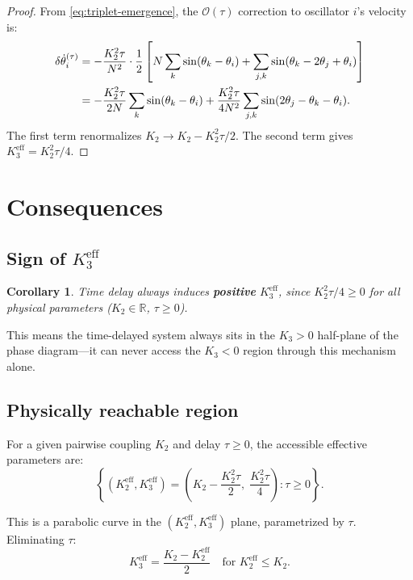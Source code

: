 \documentclass[11pt]{article}
\newcommand{\Order}{\mathcal{O}}
\newtheorem{corollary}{Corollary}
\begin{document}
\begin{proof}
  From \eqref{eq:triplet-emergence}, the $\Order(\tau)$ correction to
  oscillator $i$'s velocity is:
  \begin{align}
    \delta\dot{\theta}_i^{(\tau)}
    &= -\frac{K_2^2\tau}{N^2}\cdot\frac{1}{2}
      \left[N\sum_k\sin(\theta_k-\theta_i)
      + \sum_{j,k}\sin(\theta_k-2\theta_j+\theta_i)\right] \notag\\
    &= -\frac{K_2^2\tau}{2N}\sum_k\sin(\theta_k-\theta_i)
      + \frac{K_2^2\tau}{4N^2}\sum_{j,k}\sin(2\theta_j-\theta_k-\theta_i).
  \end{align}
  The first term renormalizes $K_2\to K_2 - K_2^2\tau/2$.
  The second term gives $K_3^{\mathrm{eff}} = K_2^2\tau/4$.
\end{proof}

\section{Consequences}

\subsection{Sign of $K_3^{\mathrm{eff}}$}

\begin{corollary}
  Time delay always induces \textbf{positive} $K_3^{\mathrm{eff}}$,
  since $K_2^2\tau/4 \ge 0$ for all physical parameters ($K_2\in\mathbb{R}$,
  $\tau\ge 0$).
\end{corollary}

This means the time-delayed system always sits in the $K_3>0$ half-plane of
the phase diagram---it can never access the $K_3<0$ region through this
mechanism alone.

\subsection{Physically reachable region}

For a given pairwise coupling $K_2$ and delay $\tau\ge 0$, the accessible
effective parameters are:
\begin{equation}
  \left\{
    \left(K_2^{\mathrm{eff}}, K_3^{\mathrm{eff}}\right)
    = \left(K_2 - \frac{K_2^2\tau}{2},\;\frac{K_2^2\tau}{4}\right)
    : \tau \ge 0
  \right\}.
\end{equation}

This is a parabolic curve in the $(K_2^{\mathrm{eff}}, K_3^{\mathrm{eff}})$
plane, parametrized by $\tau$.  Eliminating $\tau$:
\begin{equation}
  \boxed{
    K_3^{\mathrm{eff}} = \frac{K_2 - K_2^{\mathrm{eff}}}{2}
    \quad\text{for } K_2^{\mathrm{eff}} \le K_2.
  }
  \label{eq:reachable}
\end{equation}
\end{document}
